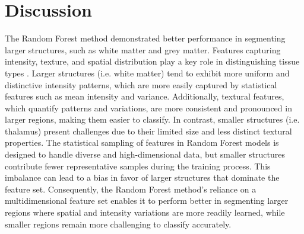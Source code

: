 \section{Discussion}


The Random Forest method demonstrated better performance in segmenting larger structures, such as white matter and grey matter. Features capturing intensity, texture, and spatial distribution play a key role in distinguishing tissue types \cite{b15}. Larger structures (i.e. white matter) tend to exhibit more uniform and distinctive intensity patterns, which are more easily captured by statistical features such as mean intensity and variance. Additionally, textural features, which quantify patterns and variations, are more consistent and pronounced in larger regions, making them easier to classify. In contrast, smaller structures (i.e. thalamus) present challenges due to their limited size and less distinct textural properties. The statistical sampling of features in Random Forest models is designed to handle diverse and high-dimensional data, but smaller structures contribute fewer representative samples during the training process. This imbalance can lead to a bias in favor of larger structures that dominate the feature set. Consequently, the Random Forest method's reliance on a multidimensional feature set enables it to perform better in segmenting larger regions where spatial and intensity variations are more readily learned, while smaller regions remain more challenging to classify accurately.

